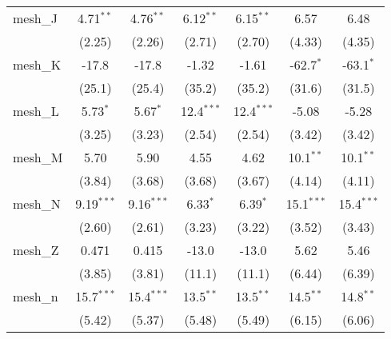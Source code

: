 \begin{tabular}{lcccccc}
   mesh\_J                                                     & 4.71$^{**}$   & 4.76$^{**}$   & 6.12$^{**}$   & 6.15$^{**}$   & 6.57          & 6.48\\   
                                                               & (2.25)        & (2.26)        & (2.71)        & (2.70)        & (4.33)        & (4.35)\\   
   mesh\_K                                                     & -17.8         & -17.8         & -1.32         & -1.61         & -62.7$^{*}$   & -63.1$^{*}$\\   
                                                               & (25.1)        & (25.4)        & (35.2)        & (35.2)        & (31.6)        & (31.5)\\   
   mesh\_L                                                     & 5.73$^{*}$    & 5.67$^{*}$    & 12.4$^{***}$  & 12.4$^{***}$  & -5.08         & -5.28\\   
                                                               & (3.25)        & (3.23)        & (2.54)        & (2.54)        & (3.42)        & (3.42)\\   
   mesh\_M                                                     & 5.70          & 5.90          & 4.55          & 4.62          & 10.1$^{**}$   & 10.1$^{**}$\\   
                                                               & (3.84)        & (3.68)        & (3.68)        & (3.67)        & (4.14)        & (4.11)\\   
   mesh\_N                                                     & 9.19$^{***}$  & 9.16$^{***}$  & 6.33$^{*}$    & 6.39$^{*}$    & 15.1$^{***}$  & 15.4$^{***}$\\   
                                                               & (2.60)        & (2.61)        & (3.23)        & (3.22)        & (3.52)        & (3.43)\\   
   mesh\_Z                                                     & 0.471         & 0.415         & -13.0         & -13.0         & 5.62          & 5.46\\   
                                                               & (3.85)        & (3.81)        & (11.1)        & (11.1)        & (6.44)        & (6.39)\\   
   mesh\_n                                                     & 15.7$^{***}$  & 15.4$^{***}$  & 13.5$^{**}$   & 13.5$^{**}$   & 14.5$^{**}$   & 14.8$^{**}$\\   
                                                               & (5.42)        & (5.37)        & (5.48)        & (5.49)        & (6.15)        & (6.06)\\   

\end{tabular}

